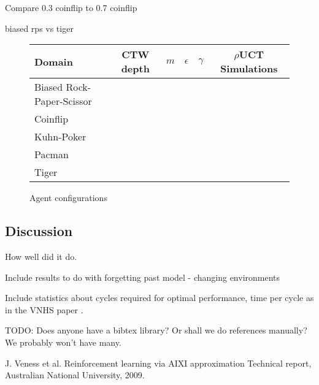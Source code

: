 \documentclass[paper=a4, fontsize=11pt]{scrartcl} %
\numberwithin{equation}{section} %
\numberwithin{figure}{section} %
\numberwithin{table}{section} %
\begin{document}
Compare 0.3 coinflip to 0.7 coinflip

biased rps vs tiger


\begin{figure}[tb]
\centering
\begin{tabular}{l|c|c|c|c|c}
Domain & CTW depth & $m$ & $\epsilon$ & $\gamma$ & $\rho$UCT Simulations\\\hline
Biased Rock-Paper-Scissor & \\
Coinflip & \\
Kuhn-Poker & \\
Pacman & \\
Tiger & \\
\end{tabular}
\caption{\label{tab:setup}Agent configurations}
\end{figure}

\subsection{Discussion}
How well did it do.

Include results to do with forgetting past model - changing environments

Include statistics about cycles required for optimal performance, time per cycle as in the VNHS paper \cite{VNHS09}.

TODO: Does anyone have a bibtex library? Or shall we do references manually? We probably won't have many.
\begin{thebibliography}{1}

J. Veness et al.
\newblock Reinforcement learning via AIXI approximation
\newblock Technical report, Australian National University, 2009.

\end{thebibliography}
\end{document}
